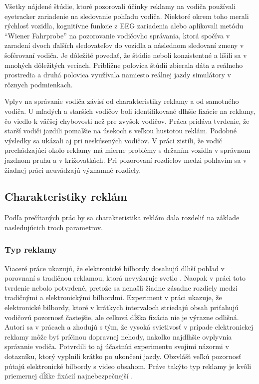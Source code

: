 Všetky nájdené štúdie, ktoré pozorovali účinky reklamy na vodiča používali eyetracker zariadenie na sledovanie pohľadu vodiča. Niektoré okrem toho merali rýchlosť vozidla, kognitívne funkcie z EEG zariadenia alebo aplikovali metódu “Wiener Fahrprobe” \cite{WF} na pozorovanie vodičovho správania, ktorá spočíva v zaradení dvoch ďalších sledovateľov do vozidla a následnom sledovaní zmeny v šoférovaní vodiča.  Je dôležité povedať, že štúdie neboli konzistentné a líšili sa v mnohých dôležitých veciach. Približne polovica štúdií zbierala dáta z reálneho prostredia a druhá polovica využívala namiesto reálnej jazdy simulátory v rôznych podmienkach.

Vplyv na správanie vodiča závisí od charakteristiky reklamy a od samotného vodiča. U mladých \cite{stavrinos2016visual} a starších vodičov \cite{belyusar2016field, EDQUIST2011619} boli identifikované dlhšie fixácie na reklamy, čo viedlo k väčšej chybovosti než pre zvyšok vodičov. Práca \cite{horberry200813} pridáva tvrdenie, že starší vodiči jazdili pomalšie na úsekoch s veľkou hustotou reklám. Podobné výsledky sa ukázali aj pri neskúsených vodičov. V práci \cite{bendak2010role} zistili, že vodič prechádzajúci okolo reklamy má mierne problémy s držaním vozidla v správnom jazdnom pruhu a v križovatkách. Pri pozorovaní rozdielov medzi pohlavím sa v žiadnej práci neuvádzajú významné rozdiely.

\subsection{Charakteristiky reklám}

Podľa prečítaných prác by sa charakteristika reklám dala rozdeliť  na základe nasledujúcich troch parametrov.

\subsubsection{Typ reklamy}
Viaceré práce ukazujú, že elektronické bilbordy dosahujú dlhší pohľad v porovnaní s tradičnou reklamou, ktorá nevyžaruje svetlo \cite{OVIEDOTRESPALACIOS201985, beijer, brome}. Naopak v práci \cite{n1} toto tvrdenie nebolo potvrdené, pretože sa nenašli žiadne zásadne rozdiely medzi tradičnými a elektronickými bilbordmi. Experiment v práci \cite{brome} ukazuje, že elektronické bilbordy, ktoré v krátkych intervaloch striedajú obsah priťahujú vodičovú pozornosť častejšie, ale celková dĺžka fixácia nie je výrazne odlišná. Autori sa v prácach \cite{mollu2018driving} a \cite{beijer} zhodujú s tým, že vysoká svietivosť v prípade elektronickej reklamy môže byť príčinou dopravnej nehody, nakoľko najdlhšie ovplyvnia správanie vodiča. Potvrdili to aj účastníci experimentu svojimi názormi v dotazníku, ktorý vyplnili krátko po ukončení jazdy. Obzvlášť veľkú pozornosť pútajú elektronické bilbordy s video obsahom. Práve takýto typ reklamy je kvôli priemernej dĺžke fixácií najnebezpečnejší \cite{yellappan2016exposure, smiley2005traffic}.

